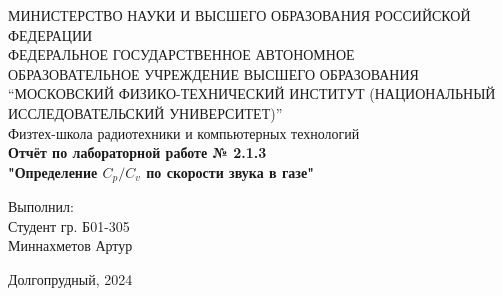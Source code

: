 \begin{center}
МИНИСТЕРСТВО НАУКИ И ВЫСШЕГО ОБРАЗОВАНИЯ РОССИЙСКОЙ ФЕДЕРАЦИИ\\
\hfill \break
ФЕДЕРАЛЬНОЕ ГОСУДАРСТВЕННОЕ АВТОНОМНОЕ \\ ОБРАЗОВАТЕЛЬНОЕ УЧРЕЖДЕНИЕ ВЫСШЕГО ОБРАЗОВАНИЯ \\
“МОСКОВСКИЙ ФИЗИКО-ТЕХНИЧЕСКИЙ ИНСТИТУТ (НАЦИОНАЛЬНЫЙ ИССЛЕДОВАТЕЛЬСКИЙ УНИВЕРСИТЕТ)” \\

\hfill \break
Физтех-школа радиотехники и компьютерных технологий\\
\vspace{2.5cm}
\large{\textbf{Отчёт по лабораторной работе № 2.1.3}}\\
\large{\textbf{"Определение $C_p/C_v$ по скорости звука в газе"}}\\
\hfill \break
\end{center}

\vspace{5cm}

\begin{flushright}
Выполнил:\\
Студент гр. Б01-305\\
Миннахметов Артур\\
\end{flushright}

\vfill


\begin{center} Долгопрудный, 2024 \end{center}

\thispagestyle{empty}
\newpage
